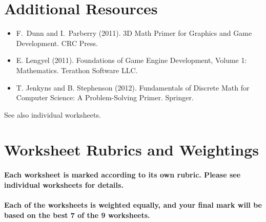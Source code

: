 \documentclass{../../fal_assignment}
\begin{document}
\section*{Additional Resources}

\begin{itemize}
    \item F.\ Dunn and I.\ Parberry (2011). 3D Math Primer for Graphics and Game Development. CRC Press.
    \item E. Lengyel (2011). Foundations of Game Engine Development, Volume 1: Mathematics. Terathon Software LLC.
    \item T. Jenkyns and B. Stephenson (2012). Fundamentals of Discrete Math for Computer Science: A Problem-Solving Primer. Springer.
\end{itemize}

See also individual worksheets.

\section*{Worksheet Rubrics and Weightings}

\paragraph{Each worksheet is marked according to its own rubric. Please see individual worksheets for details.}

\paragraph{Each of the worksheets is \textbf{weighted equally}, and your final mark will be based on the \textbf{best 7 of the 9} worksheets.}


\end{document}
